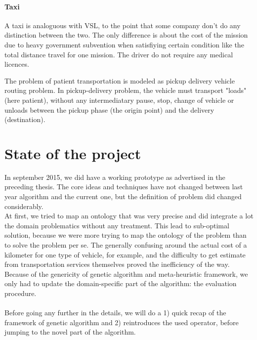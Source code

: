 \documentclass[12pt]{memoir}
\begin{document}
  \paragraph{Taxi} %
\label{par:Taxi}
A taxi is analoguous with VSL, to the point that some company don't do any
distinction between the two. The only difference is about the cost of the mission
due to heavy government subvention when satisfiying certain condition like the total
distance travel for one mission. The driver do not require any medical licences.

The problem of patient transportation is modeled as pickup delivery vehicle routing
problem. In pickup-delivery problem, the vehicle must transport "loads" (here
patient), without any intermediatary pause, stop, change of vehicle or unloads
between the pickup phase (the origin point) and the delivery (destination).

\section{State of the project}
In september 2015, we did have a working prototype as advertised in the preceding
thesis. The core ideas and techniques have not changed between last year algorithm
and the current one, but the definition of problem did changed considerably. \\
At first, we tried to map an ontology that was very precise and did integrate a lot
the domain problematics without any treatment. This lead to sub-optimal solution,
because we were more trying to map the ontology of the problem than to solve the
problem per se. The generally confusing around the actual cost of a kilometer for
one type of vehicle, for example, and the difficulty to get estimate from transportation services
themselves proved the inefficiency of the way.\\
Because of the genericity of genetic algorithm and meta-heuristic framework, we only
had to update the domain-specific part of the algorithm: the evaluation procedure.\\
\\
Before going any further in the details, we will do a 1) quick recap of the framework
of genetic algorithm and 2) reintroduces the used operator, before jumping to the
novel part of the algorithm.
\end{document}
